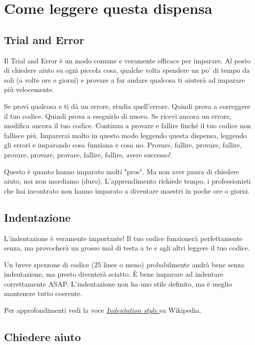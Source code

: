 \section*{Come leggere questa dispensa}

\subsection*{Trial and Error}

Il Trial and Error è un modo comune e veramente efficace per imparare. Al posto di chiedere aiuto su ogni piccola cosa, qualche volta spendere un po' di tempo da soli (a volte ore e giorni) e provare a far andare qualcosa ti aiuterà ad imparare più velocemente.

Se provi qualcosa e ti dà un errore, studia quell'errore. Quindi prova a correggere il tuo codice. Quindi prova a eseguirlo di nuovo. Se ricevi ancora un errore, modifica ancora il tuo codice. Continua a provare e fallire finché il tuo codice non fallisce più. Imparerai molto in questo modo leggendo questa dispensa, leggendo gli errori e imparando cosa funziona e cosa no. Provare, fallire, provare, fallire, provare, provare, provare, fallire, fallire, avere successo!

Questo è quanto hanno imparato molti "pros". Ma non aver paura di chiedere aiuto, noi non mordiamo (duro). L'apprendimento richiede tempo, i professionisti che hai incontrato non hanno imparato a diventare maestri in poche ore o giorni.

\subsection*{Indentazione}

L'indentazione è veramente importante! Il tuo codice funzionerà perfettamente senza, ma provocherà un grosso mal di testa a te e agli altri leggere il tuo codice.

Un breve spezzone di codice (25 linee o meno) probabilmente andrà bene senza indentazione, ma presto diventerà sciatto. È bene imparare ad indentare correttamente ASAP. L'indentazione non ha uno stile definito, ma è meglio mantenere tutto coerente.

Per approfondimenti vedi la voce \href{https://en.wikipedia.org/wiki/Indentation_style}{\emph{Indentation style} \ExternalLink} su Wikipedia.

\subsection*{Chiedere aiuto}

